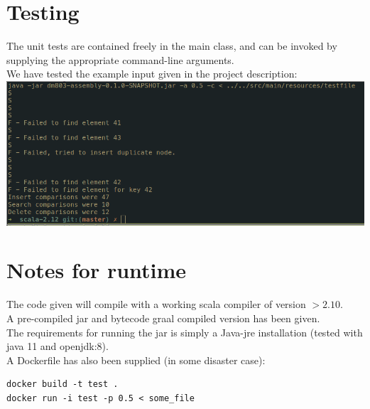 \documentclass[oneside]{scrbook}
\begin{document}
\section*{Testing}
The unit tests are contained freely in the main class, and can be invoked by supplying the appropriate command-line arguments.\\
We have tested the example input given in the project description:\\
\includegraphics[scale=0.5]{kimtest.png}

\section*{Notes for runtime}
The code given will compile with a working scala compiler of version $> 2.10$.\\
A pre-compiled jar and bytecode graal compiled version has been given.\\
The requirements for running the jar is simply a Java-jre installation (tested with java 11 and openjdk:8).\\
A Dockerfile has also been supplied (in some disaster case):
\begin{lstlisting}
docker build -t test .
docker run -i test -p 0.5 < some_file
\end{lstlisting}
\end{document}
